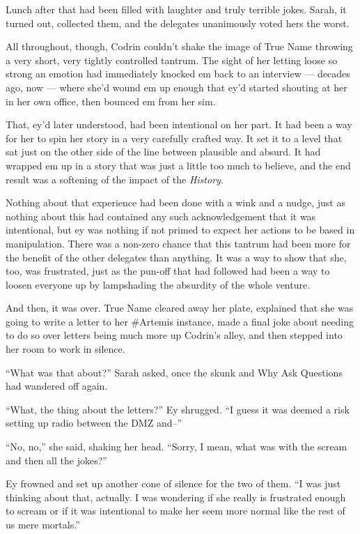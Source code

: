 Lunch after that had been filled with laughter and truly terrible jokes. Sarah, it turned out, collected them, and the delegates unanimously voted hers the worst.

All throughout, though, Codrin couldn't shake the image of True Name throwing a very short, very tightly controlled tantrum. The sight of her letting loose so strong an emotion had immediately knocked em back to an interview --- decades ago, now --- where she'd wound em up enough that ey'd started shouting at her in her own office, then bounced em from her sim.

That, ey'd later understood, had been intentional on her part. It had been a way for her to spin her story in a very carefully crafted way. It set it to a level that sat just on the other side of the line between plausible and absurd. It had wrapped em up in a story that was just a little too much to believe, and the end result was a softening of the impact of the \emph{History}.

Nothing about that experience had been done with a wink and a nudge, just as nothing about this had contained any such acknowledgement that it was intentional, but ey was nothing if not primed to expect her actions to be based in manipulation. There was a non-zero chance that this tantrum had been more for the benefit of the other delegates than anything. It was a way to show that she, too, was frustrated, just as the pun-off that had followed had been a way to loosen everyone up by lampshading the absurdity of the whole venture.

And then, it was over. True Name cleared away her plate, explained that she was going to write a letter to her \#Artemis instance, made a final joke about needing to do so over letters being much more up Codrin's alley, and then stepped into her room to work in silence.

``What was that about?'' Sarah asked, once the skunk and Why Ask Questions had wandered off again.

``What, the thing about the letters?'' Ey shrugged. ``I guess it was deemed a risk setting up radio between the DMZ and--''

``No, no,'' she said, shaking her head. ``Sorry, I mean, what was with the scream and then all the jokes?''

Ey frowned and set up another cone of silence for the two of them. ``I was just thinking about that, actually. I was wondering if she really is frustrated enough to scream or if it was intentional to make her seem more normal like the rest of us mere mortals.''

